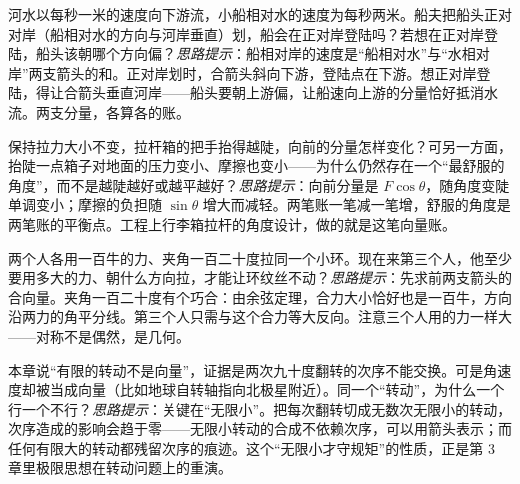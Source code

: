 \begin{puzzles}
\item 河水以每秒一米的速度向下游流，小船相对水的速度为每秒两米。船夫把船头正对对岸（船相对水的方向与河岸垂直）划，船会在正对岸登陆吗？若想在正对岸登陆，船头该朝哪个方向偏？\emph{思路提示}：船相对岸的速度是“船相对水”与“水相对岸”两支箭头的和。正对岸划时，合箭头斜向下游，登陆点在下游。想正对岸登陆，得让合箭头垂直河岸——船头要朝上游偏，让船速向上游的分量恰好抵消水流。两支分量，各算各的账。
\item 保持拉力大小不变，拉杆箱的把手抬得越陡，向前的分量怎样变化？可另一方面，抬陡一点箱子对地面的压力变小、摩擦也变小——为什么仍然存在一个“最舒服的角度”，而不是越陡越好或越平越好？\emph{思路提示}：向前分量是 \(F\cos\theta\)，随角度变陡单调变小；摩擦的负担随 \(\sin\theta\) 增大而减轻。两笔账一笔减一笔增，舒服的角度是两笔账的平衡点。工程上行李箱拉杆的角度设计，做的就是这笔向量账。
\item 两个人各用一百牛的力、夹角一百二十度拉同一个小环。现在来第三个人，他至少要用多大的力、朝什么方向拉，才能让环纹丝不动？\emph{思路提示}：先求前两支箭头的合向量。夹角一百二十度有个巧合：由余弦定理，合力大小恰好也是一百牛，方向沿两力的角平分线。第三个人只需与这个合力等大反向。注意三个人用的力一样大——对称不是偶然，是几何。
\item 本章说“有限的转动不是向量”，证据是两次九十度翻转的次序不能交换。可是角速度却被当成向量（比如地球自转轴指向北极星附近）。同一个“转动”，为什么一个行一个不行？\emph{思路提示}：关键在“无限小”。把每次翻转切成无数次无限小的转动，次序造成的影响会趋于零——无限小转动的合成不依赖次序，可以用箭头表示；而任何有限大的转动都残留次序的痕迹。这个“无限小才守规矩”的性质，正是第 3 章里极限思想在转动问题上的重演。
\end{puzzles}
